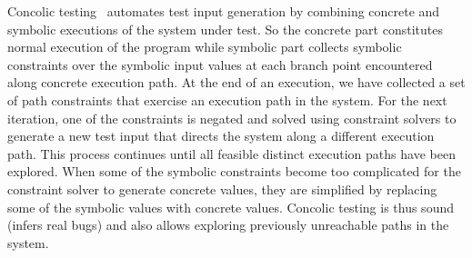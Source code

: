 Concolic testing~\cite{SEN07} automates test input generation by combining concrete and symbolic executions of the system under test. So the concrete part constitutes normal execution of the program while symbolic part collects symbolic constraints over the symbolic input values at each branch point encountered along concrete execution path. At the end of an execution, we have collected a set of path constraints that exercise an execution path in the system. For the next iteration, one of the constraints is negated and solved using constraint solvers to generate a new test input that directs the system along a different execution path. This process continues until all feasible distinct execution paths have been explored. When some of the symbolic constraints become too complicated for the constraint solver to generate concrete values, they are simplified by replacing some of the symbolic values with concrete values.
Concolic testing is thus sound (infers real bugs) and also allows exploring previously unreachable paths in the system. 
